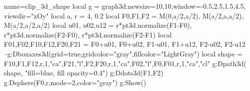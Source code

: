 \documentclass[10pt]{standalone}%
\begin{document}
\begin{luadraw}{name=clip_3d_shape}
local g = graph3d:new{size={10,10},window={-0.5,2.5,1.5,4.5}, viewdir="xOy"}
local a, r = 4, 0.2
local F0,F1,F2 = M(0,a/2,a/2), M(a/2,a,a/2), M(a/2,a/2,a/2)
local u01, u02,u12 = r*pt3d.normalize(F1-F0), r*pt3d.normalize(F2-F0), r*pt3d.normalize(F2-F1)
local F01,F02,F10,F12,F20,F21 = F0+u01, F0+u02, F1-u01, F1+u12, F2-u02, F2-u12
--g:Dboxaxes3d({grid=true,gridcolor="gray",fillcolor="LightGray"})
local shape = {F10,F1,F12,r,1,"ca",F21,"l",F2,F20,r,1,"ca",F02,"l",F0,F01,r,1,"ca","cl"} 
g:Dpath3d( shape, "fill=blue, fill opacity=0.4")
g:Ddots3d({F1,F2})
g:Dsphere(F0,r,{mode=2,color="gray"})
g:Show()
\end{luadraw}
\end{document}
